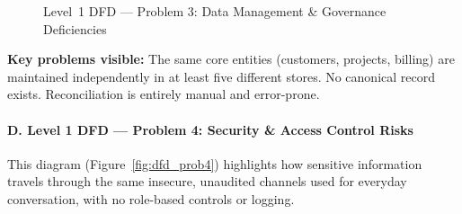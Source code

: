 \documentclass[12pt,a4paper]{report}
\begin{document}
\begin{figure}[H]
{
}
\caption{Level~1 DFD — Problem 3: Data Management \& Governance Deficiencies}
\label{fig:dfd_prob3}
\end{figure}

\begin{problemBox}
\textbf{Key problems visible:} The same core entities (customers, projects, billing) are maintained independently in at least five different stores. No canonical record exists. Reconciliation is entirely manual and error-prone.
\end{problemBox}

\paragraph{D. Level 1 DFD — Problem 4: Security \& Access Control Risks}

This diagram (Figure~\ref{fig:dfd_prob4}) highlights how sensitive information travels through the same insecure, unaudited channels used for everyday conversation, with no role-based controls or logging.
\end{document}
